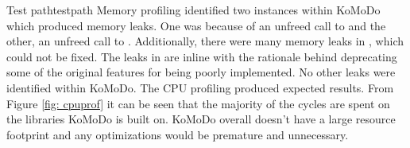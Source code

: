 {
		}{Test path}{testpath}
%
Memory profiling identified two instances within KoMoDo which produced memory leaks. One was because of an unfreed call to  and the other, an unfreed call to . Additionally, there were many memory leaks in , which could not be fixed. The leaks in  are inline with the rationale behind deprecating some of the original features for being poorly implemented.
%
No other leaks were identified within KoMoDo.
%
The CPU profiling produced expected results. From Figure \ref{fig: cpuprof} it can be seen that the majority of the cycles are spent on the libraries KoMoDo is built on. KoMoDo overall doesn't have a large resource footprint and any optimizations would be premature and unnecessary.

